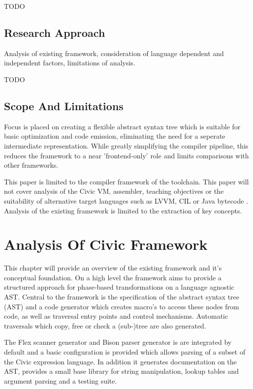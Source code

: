 \documentclass[twoside,openright]{uva-bachelor-thesis}
\begin{document}
		TODO
	
	\section{Research Approach}
		Analysis of existing framework, consideration of language dependent and independent factors, limitations of analysis.
		
		TODO
	
	\section{Scope And Limitations}
		 Focus is placed on creating a flexible abstract syntax tree which is suitable for basic optimization and code emission, eliminating the need for a seperate intermediate representation. While greatly simplifying the compiler pipeline, this reduces the framework to a near 'frontend-only' role and limits comparisons with other frameworks.
		
		This paper is limited to the compiler framework of the toolchain. This paper will not cover analysis of the Civic VM, assembler, teaching objectives or the suitability of alternative target languages such as LVVM, CIL or Java bytecode \cite{lattner2002llvm}\cite{website:sac}. Analysis of the existing framework is limited to the extraction of key concepts.


\chapter{Analysis Of Civic Framework}
	This chapter will provide an overview of the existing framework and it's conceptual foundation. On a high level the framework aims to provide a structured approach for phase-based transformations on a language agnostic AST. Central to the framework is the specification of the abstract syntax tree (AST) and a code generator which creates macro's to access these nodes from code, as well as traversal entry points and control mechanisms. Automatic traversals which copy, free or check a (sub-)tree are also generated.
	
	The Flex scanner generator and Bison parser generator is are integrated by default and a basic configuration is provided which allows parsing of a subset of the Civic expression language. In addition it generates documentation on the AST, provides a small base library for string manipulation, lookup tables and argument parsing and a testing suite.
				
\end{document}
